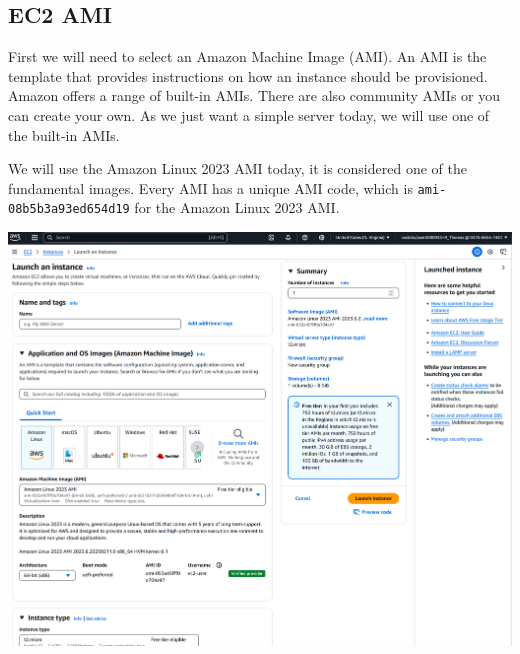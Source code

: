\documentclass{csse4400}
\begin{document}
\subsection{EC2 AMI}
First we will need to select an Amazon Machine Image (AMI).
An AMI is the template that provides instructions on how an instance should be provisioned.
Amazon offers a range of built-in AMIs. There are also community AMIs or you can create your own.
As we just want a simple server today, we will use one of the built-in AMIs.

We will use the Amazon Linux 2023 AMI today,
it is considered one of the fundamental images.
Every AMI has a unique AMI code,
which is \texttt{ami-08b5b3a93ed654d19} for the Amazon Linux 2023 AMI.

\vspace{3mm}
\noindent
\includegraphics[width=\textwidth]{images/launch-instance}

\end{document}
